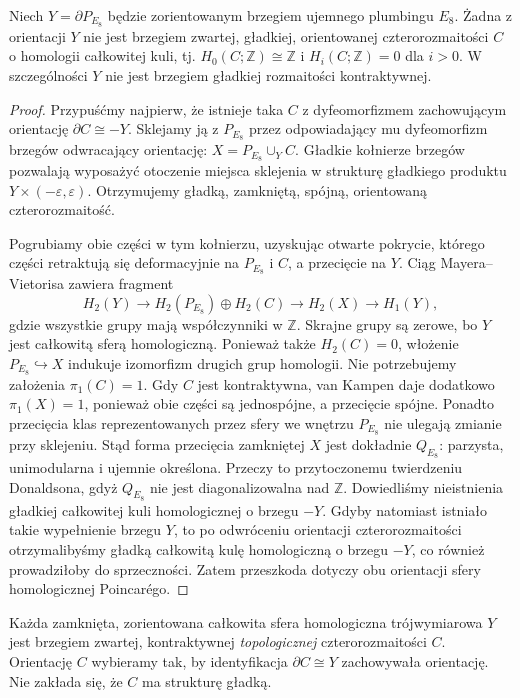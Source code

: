 \begin{twierdzenie}
\label{thm:tg-E8-no-smooth-fill}
Niech $Y=\partial P_{E_8}$ będzie zorientowanym brzegiem
ujemnego plumbingu $E_8$. Żadna z orientacji $Y$
nie jest brzegiem zwartej, gładkiej, orientowanej
czterorozmaitości $C$ o homologii całkowitej kuli,
tj. $H_0(C;\mathbb Z)\cong\mathbb Z$ i
$H_i(C;\mathbb Z)=0$ dla $i>0$.
W szczególności $Y$ nie jest brzegiem gładkiej
rozmaitości kontraktywnej.
\end{twierdzenie}
\begin{proof}
Przypuśćmy najpierw, że istnieje taka $C$ z
dyfeomorfizmem zachowującym orientację
$\partial C\cong -Y$. Sklejamy ją z $P_{E_8}$
przez odpowiadający mu dyfeomorfizm brzegów
odwracający orientację:
$X=P_{E_8}\cup_Y C$.
Gładkie kołnierze brzegów pozwalają wyposażyć
otoczenie miejsca sklejenia w strukturę
gładkiego produktu $Y\times(-\varepsilon,\varepsilon)$.
Otrzymujemy gładką, zamkniętą, spójną,
orientowaną czterorozmaitość.

Pogrubiamy obie części w tym kołnierzu,
uzyskując otwarte pokrycie, którego części
retraktują się deformacyjnie na $P_{E_8}$ i $C$,
a przecięcie na $Y$.
Ciąg Mayera--Vietorisa zawiera fragment
\[
H_2(Y)\longrightarrow
H_2(P_{E_8})\oplus H_2(C)
\longrightarrow H_2(X)\longrightarrow H_1(Y),
\]
gdzie wszystkie grupy mają współczynniki
w $\mathbb Z$. Skrajne grupy są zerowe,
bo $Y$ jest całkowitą sferą homologiczną.
Ponieważ także $H_2(C)=0$, włożenie
$P_{E_8}\hookrightarrow X$ indukuje izomorfizm
drugich grup homologii.
Nie potrzebujemy założenia $\pi_1(C)=1$.
Gdy $C$ jest kontraktywna, van Kampen daje
dodatkowo $\pi_1(X)=1$, ponieważ obie
części są jednospójne, a przecięcie spójne.
Ponadto przecięcia klas reprezentowanych przez sfery
we wnętrzu $P_{E_8}$ nie ulegają zmianie przy sklejeniu.
Stąd forma przecięcia zamkniętej $X$ jest dokładnie
$Q_{E_8}$: parzysta, unimodularna i ujemnie określona.
Przeczy to przytoczonemu twierdzeniu Donaldsona,
gdyż $Q_{E_8}$ nie jest diagonalizowalna nad $\mathbb Z$.
Dowiedliśmy nieistnienia gładkiej całkowitej
kuli homologicznej o brzegu $-Y$.
Gdyby natomiast istniało takie wypełnienie
brzegu $Y$, to po odwróceniu orientacji
czterorozmaitości otrzymalibyśmy gładką
całkowitą kulę homologiczną o brzegu $-Y$,
co również prowadziłoby do sprzeczności.
Zatem przeszkoda dotyczy obu orientacji
sfery homologicznej Poincarégo.
\end{proof}

\begin{twierdzenie}
\label{thm:tg-freedman-homology-fill}
Każda zamknięta, zorientowana całkowita sfera homologiczna
trójwymiarowa $Y$ jest brzegiem zwartej,
kontraktywnej \emph{topologicznej} czterorozmaitości $C$.
Orientację $C$ wybieramy tak, by identyfikacja
$\partial C\cong Y$ zachowywała orientację.
Nie zakłada się, że $C$ ma strukturę gładką.
\end{twierdzenie}

